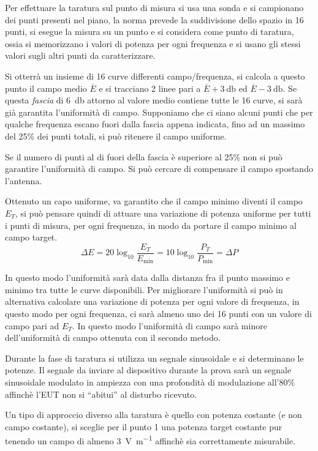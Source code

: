 Per effettuare la taratura sul punto di misura si usa una sonda e si campionano dei punti presenti nel
piano, la norma prevede la suddivisione dello spazio in 16 punti, si esegue la
misura su un punto e si considera come punto di taratura, ossia si memorizzano
i valori di potenza per ogni frequenza e si usano gli stessi valori sugli altri
punti da caratterizzare.

Si otterrà un insieme di 16 curve differenti campo/frequenza, si calcola a questo punto
il campo medio $\overline{E}$ e si tracciano 2 linee pari a $\overline{E} + \SI{3}{\decibel} $ ed $\overline{E} - \SI{3}{\decibel} $.
Se questa \textit{fascia} di \SI{6}{\decibel} attorno al valore medio
contiene tutte le 16 curve, si sarà già garantita l'uniformità di campo.
Supponiamo che ci siano alcuni punti che per qualche frequenza escano fuori dalla fascia
appena indicata, fino ad un massimo del 25\% dei punti totali, si può ritenere il campo
uniforme.

Se il numero di punti al di fuori della fascia è superiore al 25\% non si può garantire l'uniformità di campo. Si può cercare di compensare il campo spostando l'antenna.

Ottenuto un capo uniforme, va garantito che il campo minimo diventi il campo $E_T$,  
si può pensare quindi di attuare una variazione di potenza uniforme per tutti i punti
di misura, per ogni frequenza, in modo da portare il campo minimo al campo target.
$$
\Delta E = 20\log_{10}\frac{E_T}{E_{\text{min}}} = 10\log_{10}\frac{P_T}{P_{\text{min}}} = \Delta P
$$

In questo modo l'uniformità sarà data dalla distanza fra il punto massimo e minimo
tra tutte le curve disponibili. Per migliorare l'uniformità si può in alternativa
calcolare una variazione di potenza per ogni valore di frequenza, in questo modo
per ogni frequenza, ci sarà almeno uno dei 16 punti con un valore di campo pari ad $E_T$.
In questo modo l'uniformità di campo sarà minore dell'uniformità di campo ottenuta con il
secondo metodo.

Durante la fase di taratura si utilizza un segnale sinusoidale e si determinano le potenze.
Il segnale da inviare al dispositivo durante la prova sarà un segnale sinusoidale modulato in ampiezza
con una profondità di modulazione all'80\% affinchè l'EUT non si ``abitui'' al disturbo ricevuto.

Un tipo di approccio diverso alla taratura è quello con potenza costante (e non campo costante),
si sceglie per il punto 1 una potenza target costante pur tenendo un campo di almeno
\SI[per-mode=symbol]{3}{\volt\per\meter} affinchè sia correttamente misurabile.
